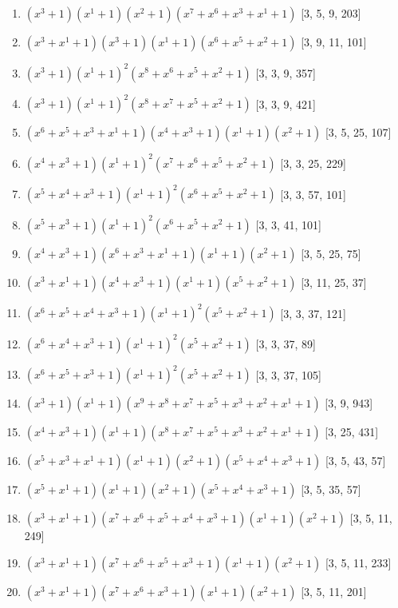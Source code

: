 \documentclass[10pt,twocolumn]{article}
\begin{document}
\begin{enumerate}
\item $(x^{3} + 1)(x^{1} + 1)(x^{2} + 1)(x^{7} + x^{6} + x^{3} + x^{1} + 1)$  [3, 5, 9, 203]
\item $(x^{3} + x^{1} + 1)(x^{3} + 1)(x^{1} + 1)(x^{6} + x^{5} + x^{2} + 1)$  [3, 9, 11, 101]
\item $(x^{3} + 1)(x^{1} + 1)^{2}(x^{8} + x^{6} + x^{5} + x^{2} + 1)$  [3, 3, 9, 357]
\item $(x^{3} + 1)(x^{1} + 1)^{2}(x^{8} + x^{7} + x^{5} + x^{2} + 1)$  [3, 3, 9, 421]
\item $(x^{6} + x^{5} + x^{3} + x^{1} + 1)(x^{4} + x^{3} + 1)(x^{1} + 1)(x^{2} + 1)$  [3, 5, 25, 107]
\item $(x^{4} + x^{3} + 1)(x^{1} + 1)^{2}(x^{7} + x^{6} + x^{5} + x^{2} + 1)$  [3, 3, 25, 229]
\item $(x^{5} + x^{4} + x^{3} + 1)(x^{1} + 1)^{2}(x^{6} + x^{5} + x^{2} + 1)$  [3, 3, 57, 101]
\item $(x^{5} + x^{3} + 1)(x^{1} + 1)^{2}(x^{6} + x^{5} + x^{2} + 1)$  [3, 3, 41, 101]
\item $(x^{4} + x^{3} + 1)(x^{6} + x^{3} + x^{1} + 1)(x^{1} + 1)(x^{2} + 1)$  [3, 5, 25, 75]
\item $(x^{3} + x^{1} + 1)(x^{4} + x^{3} + 1)(x^{1} + 1)(x^{5} + x^{2} + 1)$  [3, 11, 25, 37]
\item $(x^{6} + x^{5} + x^{4} + x^{3} + 1)(x^{1} + 1)^{2}(x^{5} + x^{2} + 1)$  [3, 3, 37, 121]
\item $(x^{6} + x^{4} + x^{3} + 1)(x^{1} + 1)^{2}(x^{5} + x^{2} + 1)$  [3, 3, 37, 89]
\item $(x^{6} + x^{5} + x^{3} + 1)(x^{1} + 1)^{2}(x^{5} + x^{2} + 1)$  [3, 3, 37, 105]
\item $(x^{3} + 1)(x^{1} + 1)(x^{9} + x^{8} + x^{7} + x^{5} + x^{3} + x^{2} + x^{1} + 1)$  [3, 9, 943]
\item $(x^{4} + x^{3} + 1)(x^{1} + 1)(x^{8} + x^{7} + x^{5} + x^{3} + x^{2} + x^{1} + 1)$  [3, 25, 431]
\item $(x^{5} + x^{3} + x^{1} + 1)(x^{1} + 1)(x^{2} + 1)(x^{5} + x^{4} + x^{3} + 1)$  [3, 5, 43, 57]
\item $(x^{5} + x^{1} + 1)(x^{1} + 1)(x^{2} + 1)(x^{5} + x^{4} + x^{3} + 1)$  [3, 5, 35, 57]
\item $(x^{3} + x^{1} + 1)(x^{7} + x^{6} + x^{5} + x^{4} + x^{3} + 1)(x^{1} + 1)(x^{2} + 1)$  [3, 5, 11, 249]
\item $(x^{3} + x^{1} + 1)(x^{7} + x^{6} + x^{5} + x^{3} + 1)(x^{1} + 1)(x^{2} + 1)$  [3, 5, 11, 233]
\item $(x^{3} + x^{1} + 1)(x^{7} + x^{6} + x^{3} + 1)(x^{1} + 1)(x^{2} + 1)$  [3, 5, 11, 201]

\end{enumerate}
\end{document}
